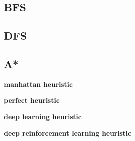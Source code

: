 \subsection{BFS}
\label{BFSSS}


\subsection{DFS}
\label{DFSSS}



\subsection{A*}
\label{ASSS}

\textbf{manhattan heuristic}

\textbf{perfect heuristic}

\textbf{deep learning heuristic}

\textbf{deep reinforcement learning heuristic}


